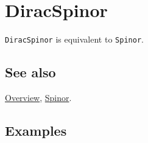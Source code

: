 \documentclass[../FeynCalcManual.tex]{subfiles}
\begin{document}
\hypertarget{diracspinor}{%
\section{DiracSpinor}\label{diracspinor}}

\texttt{DiracSpinor} is equivalent to \texttt{Spinor}.

\subsection{See also}

\hyperlink{toc}{Overview}, \hyperlink{spinor}{Spinor}.

\subsection{Examples}
\end{document}
